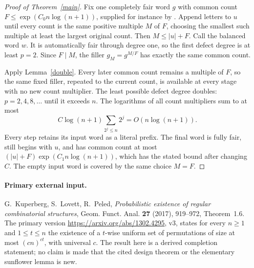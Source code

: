 \documentclass[11pt]{article}
\begin{document}
\begin{proof}[Proof of Theorem~\ref{main}]
Fix one completely fair word $g$ with common count
$F\le\exp(C_0n\log(n+1))$, supplied for instance by
.
Append letters to $u$ until every count is the same positive multiple
$M$ of $F$, choosing the smallest such multiple at least the largest
original count. Then $M\le |u|+F$. Call the balanced word $w$.
It is automatically fair through degree one, so the first defect
degree is at least $p=2$. Since $F\mid M$, the filler
$g_M=g^{M/F}$ has exactly the same common count.

Apply Lemma~\ref{double}. Every later common count remains a multiple
of $F$, so the same fixed filler, repeated to the current count, is
available at every stage with no new count multiplier.
The least possible defect degree doubles: $p=2,4,8,\ldots$ until it
exceeds $n$. The logarithms of all count multipliers sum to at most
\[
 C\log(n+1)\sum_{2^j\le n}2^j=O(n\log(n+1)).
\]
Every step retains its input word as a literal prefix. The final word
is fully fair, still begins with $u$, and has common count at most
$(|u|+F)\exp(C_1n\log(n+1))$, which has the stated bound after changing
$C$. The empty input word is covered by the same choice $M=F$.
\end{proof}

\paragraph{Primary external input.}
G.~Kuperberg, S.~Lovett, R.~Peled,
\emph{Probabilistic existence of regular combinatorial structures},
Geom. Funct. Anal. \textbf{27} (2017), 919--972, Theorem~1.6.
The primary version \url{https://arxiv.org/abs/1302.4295}, v3, states
for every $n\ge1$ and $1\le t\le n$ the existence of a $t$-wise uniform
set of permutations of size at most $(cn)^{ct}$, with universal $c$.
The result here is a derived completion statement; no claim is made
that the cited design theorem or the elementary sunflower lemma is new.
\end{document}

